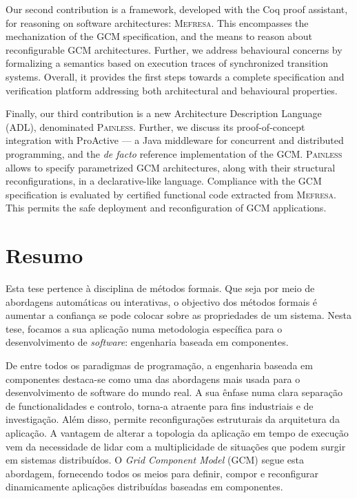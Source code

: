 	Our second contribution is a framework, developed with the Coq proof assistant,
	for reasoning on software architectures: \textsc{Mefresa}. This encompasses
	the mechanization of the GCM specification, and the means to
	reason about reconfigurable GCM architectures. Further, we address
	behavioural concerns by formalizing a semantics based on execution traces of
	synchronized transition systems.
	Overall, it provides the first steps towards a complete specification and verification
	platform addressing both architectural and behavioural properties.
						
	Finally, our third contribution is a new Architecture Description Language (ADL), 
	denominated \textsc{Painless}. Further, we discuss its proof-of-concept integration 
	with ProActive --- a Java middleware for concurrent and distributed programming,
	and the \textit{de facto} reference implementation of the GCM. 
	\textsc{Painless} allows to specify parametrized GCM architectures, along with
	their structural reconfigurations, in a declarative-like language. Compliance
	with the GCM specification is evaluated by certified	 functional code extracted from
	\textsc{Mefresa}. This permits the safe deployment and
	reconfiguration of GCM applications.
	




\chapter*{\centering Resumo}

Esta tese pertence à disciplina de m\'etodos formais. 
Que seja por meio de abordagens automáticas ou interativas, o objectivo dos métodos formais 
é aumentar a confiança se pode colocar sobre as propriedades de um sistema. 
Nesta tese, focamos a 
sua aplicação numa metodologia específica 
para o desenvolvimento de \textit{software}: engenharia baseada em componentes. 


De entre todos os paradigmas de programação, a engenharia baseada em componentes destaca-se como uma 
das abordagens mais usada para o desenvolvimento de software do mundo real. A sua ênfase 
numa clara separação de functionalidades e controlo, torna-a atraente para fins industriais 
e de investigação. Além disso, permite reconfigurações estruturais 
 da arquitetura da aplicação. A vantagem de alterar a topologia da aplicação
 em tempo de execução vem da necessidade de lidar com a multiplicidade de situações 
que podem surgir em sistemas distribuídos. 
O \textit{Grid Component Model} (GCM) segue esta abordagem, fornecendo todos 
os meios para definir, compor e reconfigurar dinamicamente aplicações distribuídas baseadas em componentes. 


